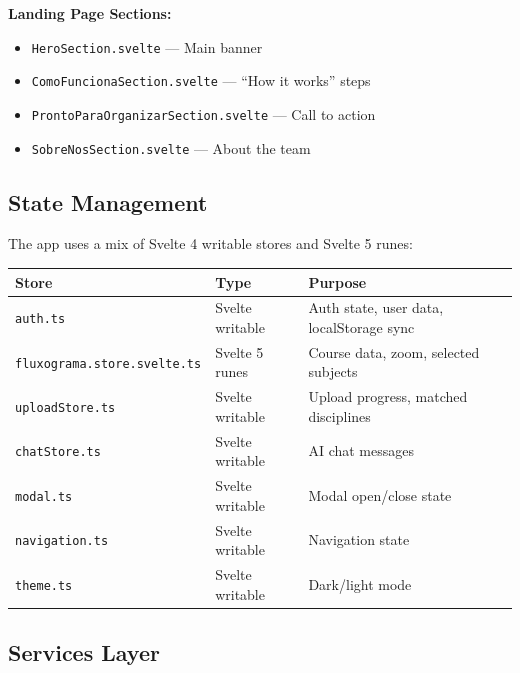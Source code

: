 \documentclass[11pt,a4paper]{article}
\newcommand{\code}[1]{\texttt{#1}}
\begin{document}
\noindent\textbf{Landing Page Sections:}
\begin{itemize}[noitemsep]
    \item \code{HeroSection.svelte} — Main banner
    \item \code{ComoFuncionaSection.svelte} — ``How it works'' steps
    \item \code{ProntoParaOrganizarSection.svelte} — Call to action
    \item \code{SobreNosSection.svelte} — About the team
\end{itemize}

\subsection{State Management}

The app uses a mix of Svelte 4 writable stores and Svelte 5 runes:

\begin{center}
\begin{longtable}{@{}L{4.8cm}L{3cm}L{5cm}@{}}
\toprule
\textbf{Store} & \textbf{Type} & \textbf{Purpose} \\
\midrule
\endhead
\code{auth.ts}                      & Svelte writable & Auth state, user data, localStorage sync \\
\code{fluxograma.store.svelte.ts}   & Svelte 5 runes  & Course data, zoom, selected subjects \\
\code{uploadStore.ts}               & Svelte writable & Upload progress, matched disciplines \\
\code{chatStore.ts}                 & Svelte writable & AI chat messages \\
\code{modal.ts}                     & Svelte writable & Modal open/close state \\
\code{navigation.ts}                & Svelte writable & Navigation state \\
\code{theme.ts}                     & Svelte writable & Dark/light mode \\
\bottomrule
\end{longtable}
\end{center}

\subsection{Services Layer}
\end{document}
